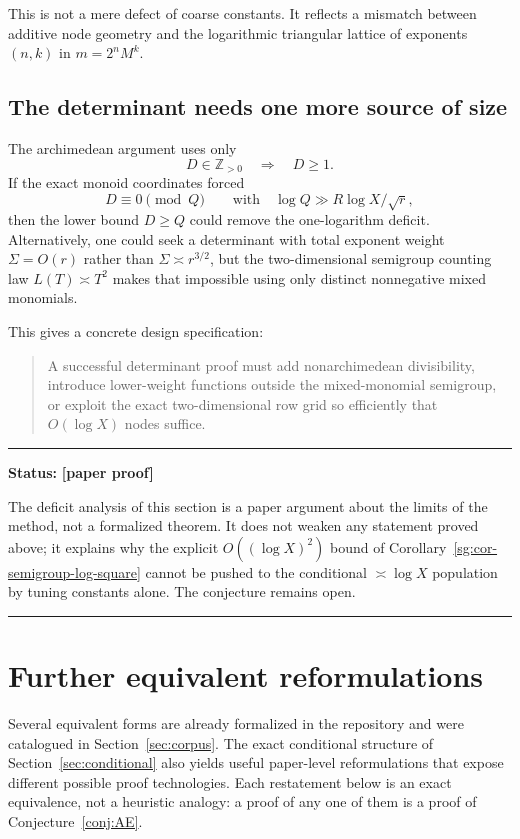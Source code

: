 \documentclass[11pt,oneside]{article}
\theoremstyle{definition}
\theoremstyle{remark}
\newcommand{\Z}{\mathbb Z}
\newcommand{\statusnew}{\textcolor{newgreen}{\textbf{[paper proof]}}}
\newenvironment{statusbox}[1]
{\begin{center}\begin{minipage}{0.94\textwidth}\raggedright\hbadness=10000\hrule
\vspace{0.45em}\textbf{Status:} #1\par\vspace{0.35em}}
{\vspace{0.35em}\hrule\end{minipage}\end{center}}
\begin{document}
This is not a mere defect of coarse constants.  It reflects a mismatch between additive node
geometry and the logarithmic triangular lattice of exponents $(n,k)$ in
$m=2^nM^k$.

\subsection{The determinant needs one more source of size}

The archimedean argument uses only
\[
 D\in\Z_{>0}\quad\Longrightarrow\quad D\ge1.
\]
If the exact monoid coordinates forced
\[
 D\equiv0\pmod{Q}
\qquad\text{with}\quad
 \log Q\gg R\log X/\sqrt r,
\]
then the lower bound $D\ge Q$ could remove the one-logarithm deficit.  Alternatively, one
could seek a determinant with total exponent weight $\Sigma=O(r)$ rather than
$\Sigma\asymp r^{3/2}$, but the two-dimensional semigroup counting law
$L(T)\asymp T^2$ makes that impossible using only distinct nonnegative mixed monomials.

This gives a concrete design specification:

\begin{quote}
A successful determinant proof must add nonarchimedean divisibility, introduce lower-weight
functions outside the mixed-monomial semigroup, or exploit the exact two-dimensional row grid
so efficiently that $O(\!\log X)$ nodes suffice.
\end{quote}

\begin{statusbox}{\statusnew}
The deficit analysis of this section is a paper argument about the limits of the method, not
a formalized theorem.  It does not weaken any statement proved above; it explains why the
explicit $O((\log X)^2)$ bound of Corollary~\ref{sg:cor-semigroup-log-square} cannot be
pushed to the conditional $\asymp\log X$ population by tuning constants alone.  The
conjecture remains open.
\end{statusbox}
\section{Further equivalent reformulations}
\label{sec:reform}

Several equivalent forms are already formalized in the repository and were catalogued in
Section~\ref{sec:corpus}.  The exact conditional structure of Section~\ref{sec:conditional}
also yields useful paper-level reformulations that expose different possible proof
technologies.  Each restatement below is an exact equivalence, not a heuristic analogy: a
proof of any one of them is a proof of Conjecture~\ref{conj:AE}.
\end{document}
